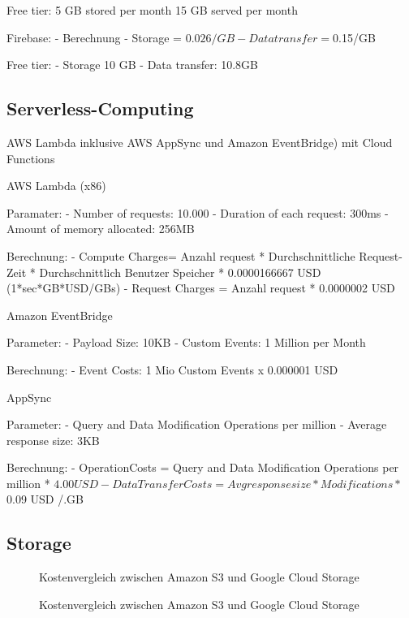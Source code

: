 Free tier:
5 GB stored per month
15 GB served per month

Firebase:
- Berechnung
    - Storage = $0.026/GB
    - Data transfer = $0.15/GB

Free tier:
- Storage 10 GB
- Data transfer: 10.8GB








\subsection{Serverless-Computing}

AWS Lambda inklusive AWS AppSync und Amazon EventBridge) mit Cloud Functions

AWS Lambda (x86)

  Paramater:
  - Number of requests: 10.000
  - Duration of each request: 300ms
  - Amount of memory allocated: 256MB

  Berechnung:
  - Compute Charges= Anzahl request * Durchschnittliche Request-Zeit * Durchschnittlich Benutzer Speicher * 0.0000166667 USD (1*sec*GB*USD/GBs)
  - Request Charges = Anzahl request * 0.0000002 USD

  Amazon EventBridge

  Parameter:
  - Payload Size: 10KB
  - Custom Events: 1 Million per Month

  Berechnung:
  - Event Costs: 1 Mio Custom Events x 0.000001 USD

  AppSync

  Parameter:
  - Query and Data Modification Operations per million
  - Average response size: 3KB

  Berechnung:
  - OperationCosts = Query and Data Modification Operations per million * $4.00 USD
  - Data Transfer Costs = Avg response size * Modifications * $0.09 USD /.GB



\subsection{Storage}

\begin{figure}%
    \centering
    \qquad
    \caption{Kostenvergleich zwischen Amazon S3 und Google Cloud Storage}%
    \label{kostenvergleichStorage}%
    \qquad
    \caption{Kostenvergleich zwischen Amazon S3 und Google Cloud Storage}%
    \label{kostenvergleichStorage}%
\end{figure}

